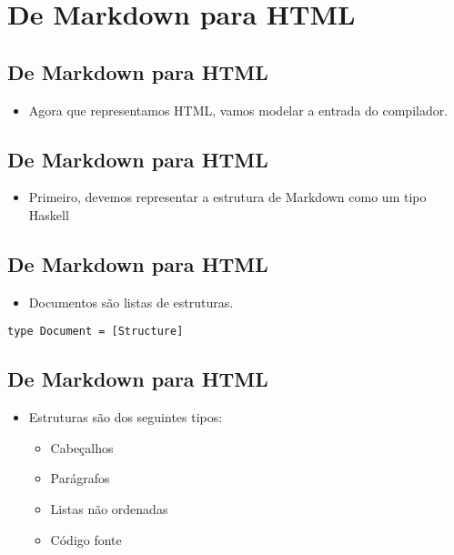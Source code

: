 \documentclass[11pt]{article}
\begin{document}
\section*{De Markdown para HTML}
\label{sec:org18f85e0}

\subsection*{De Markdown para HTML}
\label{sec:org105adda}

\begin{itemize}
\item Agora que representamos HTML, vamos modelar a entrada do compilador.
\end{itemize}
\subsection*{De Markdown para HTML}
\label{sec:org54a9b4f}

\begin{itemize}
\item Primeiro, devemos representar a estrutura de Markdown como um tipo
Haskell
\end{itemize}
\subsection*{De Markdown para HTML}
\label{sec:orgcc4ece1}

\begin{itemize}
\item Documentos são listas de estruturas.
\end{itemize}

\begin{verbatim}
type Document = [Structure]
\end{verbatim}
\subsection*{De Markdown para HTML}
\label{sec:org5261a95}

\begin{itemize}
\item Estruturas são dos seguintes tipos:
\begin{itemize}
\item Cabeçalhos
\item Parágrafos
\item Listas não ordenadas
\item Código fonte
\end{itemize}
\end{itemize}
\end{document}
